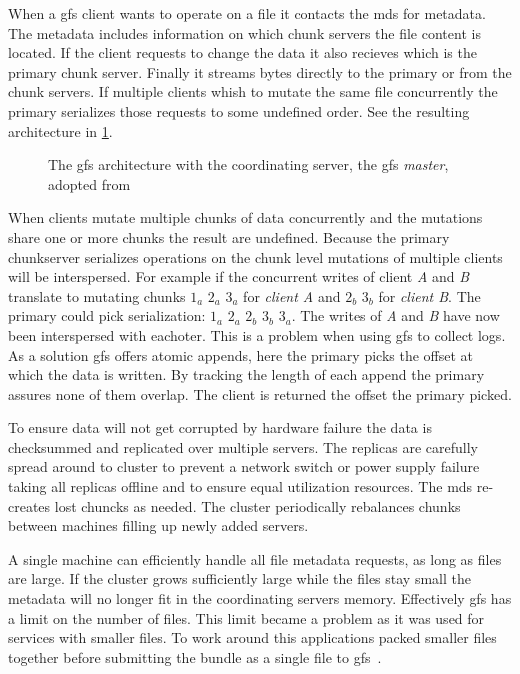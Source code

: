 When a \ac{gfs} client wants to operate on a file it contacts the \ac{mds} for metadata. The metadata includes information on which chunk servers the file content is located. If the client requests to change the data it also recieves which is the primary chunk server. Finally it streams bytes directly to the primary or from the chunk servers. If multiple clients whish to mutate the same file concurrently the primary serializes those requests to some undefined order. See the resulting architecture in \cref{fig:GFS_arch}.
%
\begin{figure}[htbp]
	\centering
	
	\caption{The \ac{gfs} architecture with the coordinating server, the \ac{gfs} \textit{master}, adopted from~\cite{GFS}}
	\label{fig:GFS_arch}
\end{figure}
%
When clients mutate multiple chunks of data concurrently and the mutations share one or more chunks the result are undefined. Because the primary chunkserver serializes operations on the chunk level mutations of multiple clients will be interspersed. For example if the concurrent writes of client \textit{A} and \textit{B} translate to mutating chunks $1_a$ $2_a$ $3_a$ for \textit{client A} and $2_b$ $3_b$ for \textit{client B}. The primary could pick serialization: $1_a$ $2_a$ $2_b$ $3_b$ $3_a$. The writes of \textit{A} and \textit{B} have now been interspersed with eachoter. This is a problem when using \ac{gfs} to collect logs. As a solution \ac{gfs} offers atomic appends, here the primary picks the offset at which the data is written. By tracking the length of each append the primary assures none of them overlap. The client is returned the offset the primary picked.

To ensure data will not get corrupted by hardware failure the data is checksummed and replicated over multiple servers. The replicas are carefully spread around to cluster to prevent a network switch or power supply failure taking all replicas offline and to ensure equal utilization resources. The \ac{mds} re-creates lost chuncks as needed. The cluster periodically rebalances chunks between machines filling up newly added servers. 

A single machine can efficiently handle all file metadata requests, as long as files are large. If the cluster grows sufficiently large while the files stay small the metadata will no longer fit in the coordinating servers memory. Effectively \ac{gfs} has a limit on the number of files. This limit became a problem as it was used for services with smaller files. To work around this applications packed smaller files together before submitting the bundle as a single file to \ac{gfs}~\cite{GFS_interview}.

